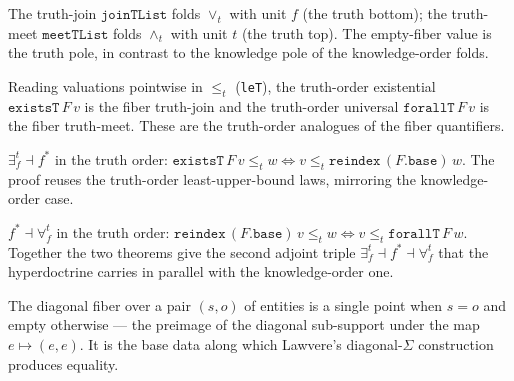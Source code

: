 \begin{definition}\label{def:charge-joinTList}\leanok{}
The truth-join $\texttt{joinTList}$ folds $\vee_t$ with unit $f$ (the truth
bottom); the truth-meet $\texttt{meetTList}$ folds $\wedge_t$ with unit $t$ (the
truth top). The empty-fiber value is the truth pole, in contrast to the knowledge
pole of the knowledge-order folds.
\end{definition}

\begin{definition}\label{def:existsT}\leanok{}
Reading valuations pointwise in $\le_t$ (\texttt{leT}), the truth-order
existential $\texttt{existsT}\,F\,v$ is the fiber truth-join and the truth-order
universal $\texttt{forallT}\,F\,v$ is the fiber truth-meet. These are the
truth-order analogues of the fiber quantifiers.
\end{definition}

\begin{theorem}\label{thm:existsT-adjunction}\leanok{}
$\exists^{t}_{f} \dashv f^{*}$ in the truth order: $\texttt{existsT}\,F\,v
\le_t w \iff v \le_t \texttt{reindex}\,(F.\texttt{base})\,w$. The proof reuses the
truth-order least-upper-bound laws, mirroring the knowledge-order case.
\end{theorem}

\begin{theorem}\label{thm:forallT-adjunction}\leanok{}
$f^{*} \dashv \forall^{t}_{f}$ in the truth order: $\texttt{reindex}\,
(F.\texttt{base})\,v \le_t w \iff v \le_t \texttt{forallT}\,F\,w$. Together the
two theorems give the second adjoint triple $\exists^{t}_{f} \dashv f^{*} \dashv
\forall^{t}_{f}$ that the hyperdoctrine carries in parallel with the
knowledge-order one.
\end{theorem}

\begin{definition}\label{def:diagFiber}\leanok
The diagonal fiber over a pair $(s, o)$ of entities is a single point when $s = o$
and empty otherwise --- the preimage of the diagonal sub-support under the map $e
\mapsto (e, e)$. It is the base data along which Lawvere's diagonal-$\Sigma$
construction produces equality.
\end{definition}

